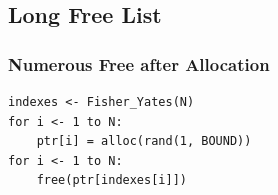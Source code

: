 \documentclass[12pt]{beamer}
\begin{document}


\subsection{Long Free List}
\begin{frame}[fragile]
\frametitle{Numerous Free after Allocation}
\begin{lstlisting}
indexes <- Fisher_Yates(N)
for i <- 1 to N:
	ptr[i] = alloc(rand(1, BOUND))
for i <- 1 to N:
	free(ptr[indexes[i]])
\end{lstlisting}
\end{frame}


\end{document}
